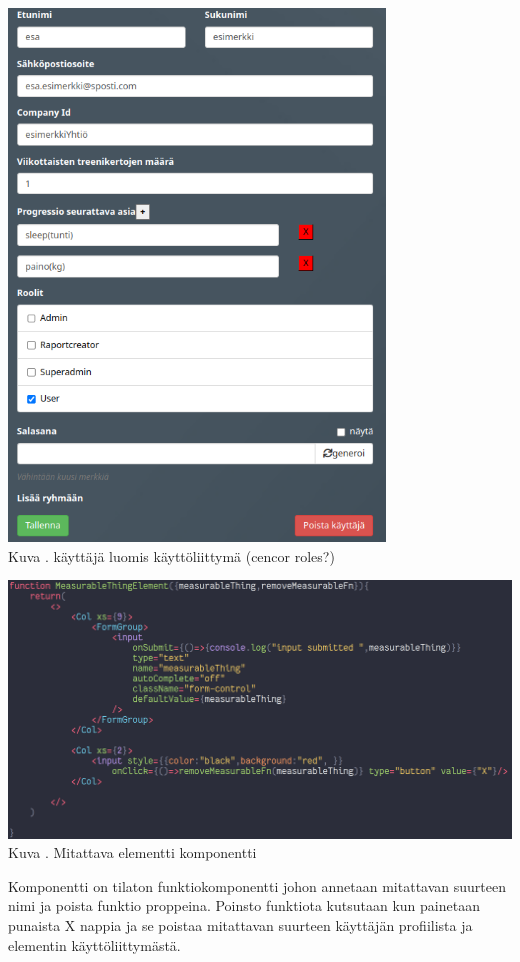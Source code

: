 \bigskip
\includegraphics[width = 10cm]{src/public/oppar/adminUserProfilePost.png}\\
Kuva \getImgCount {}. käyttäjä luomis käyttöliittymä (cencor roles?)
\bigskip


\includegraphics[width = 15cm]{src/public/oppar/measurableElementComponent.png}\\
Kuva \getImgCount {}. Mitattava elementti komponentti
\medskip

Komponentti on tilaton funktiokomponentti johon annetaan mitattavan suurteen nimi ja poista funktio proppeina.
Poinsto funktiota kutsutaan kun painetaan punaista X nappia ja se poistaa mitattavan suurteen käyttäjän profiilista ja elementin käyttöliittymästä.
\medskip


